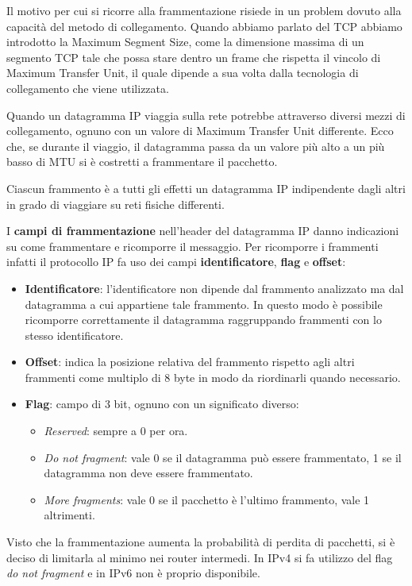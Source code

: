 Il motivo per cui si ricorre alla frammentazione risiede in un problem 
dovuto alla capacità del metodo di collegamento. Quando abbiamo parlato
del TCP abbiamo introdotto la Maximum Segment Size, come la dimensione 
massima di un segmento TCP tale che possa stare dentro un frame che
rispetta il vincolo di Maximum Transfer Unit, il quale dipende a sua
volta dalla tecnologia di collegamento che viene utilizzata.

Quando un datagramma IP viaggia sulla rete potrebbe attraverso diversi 
mezzi di collegamento, ognuno con un valore di Maximum Transfer Unit
differente. Ecco che, se durante il viaggio, il datagramma passa da un
valore più alto a un più basso di MTU si è costretti a frammentare il
pacchetto.

Ciascun frammento è a tutti gli effetti un datagramma IP indipendente
dagli altri in grado di viaggiare su reti fisiche differenti.

I \textbf{campi di frammentazione} nell'header del datagramma IP danno 
indicazioni su come frammentare e ricomporre il messaggio. Per
ricomporre i frammenti infatti il protocollo IP fa uso dei campi 
\textbf{identificatore}, \textbf{flag} e \textbf{offset}:
\begin{itemize}
	\item \textbf{Identificatore}: l'identificatore non dipende dal 
		frammento analizzato ma dal datagramma a cui appartiene tale
		frammento. In questo modo è possibile ricomporre correttamente
		il datagramma raggruppando frammenti con lo stesso 
		identificatore.
	\item \textbf{Offset}: indica la posizione relativa del frammento
		rispetto agli altri frammenti come multiplo di 8 byte in modo 
		da riordinarli quando necessario.
	\item \textbf{Flag}: campo di 3 bit, ognuno con un significato
		diverso:
		\begin{itemize}
			\item \emph{Reserved}: sempre a 0 per ora.
			\item \emph{Do not fragment}: vale 0 se il datagramma può 
				essere frammentato, 1 se il datagramma non deve essere
				frammentato.
			\item \emph{More fragments}: vale 0 se il pacchetto è
				l'ultimo frammento, vale 1 altrimenti.
		\end{itemize}
\end{itemize}
Visto che la frammentazione aumenta la probabilità di perdita di 
pacchetti, si è deciso di limitarla al minimo nei router intermedi.
In IPv4 si fa utilizzo del flag \emph{do not fragment} e in IPv6 non 
è proprio disponibile.

